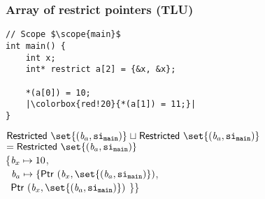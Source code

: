 \begin{frame}[fragile]
\frametitle{Array of restrict pointers (TLU)}
\begin{minipage}{.45\textwidth}
\begin{verbatim}
// Scope $\scope{main}$
int main() {
    int x;
    int* restrict a[2] = {&x, &x};

    *(a[0]) = 10;
    |\colorbox{red!20}{*(a[1]) = 11;}|
}
\end{verbatim}
\end{minipage}%
\begin{minipage}{.55\textwidth}
\colorbox{red!20}{$\restricted{\set{(\Blockvar_a, \scope{main})}} \joinsym \restricted{\set{(\Blockvar_a, \scope{main})}}$} \\
\colorbox{red!20}{$= \restricted{\set{(\Blockvar_a, \scope{main})}}$} \\

\executionannotation
{
    \{$\textit{b}_x \mapsto 10$, \\
      \ $\Blockvar_a \mapsto \{\ptr{(\Blockvar_x, \set{(\Blockvar_a, \scope{main})})}$,\\ 
      \ \qquad\quad $\ptr{(\Blockvar_x, \set{(\Blockvar_a, \scope{main})})}$ \}\}  
}
{
}
\end{minipage}
\end{frame}


